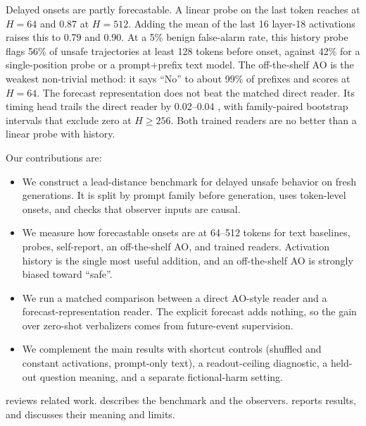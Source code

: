 Delayed onsets are partly forecastable. A linear probe on the last token reaches  at $H{=}64$ and 0.87 at $H{=}512$. Adding the mean of the last 16 layer-18 activations raises this to 0.79 and 0.90. At a 5\% benign false-alarm rate, this history probe flags 56\% of unsafe trajectories at least 128 tokens before onset, against 42\% for a single-position probe or a prompt+prefix text model. The off-the-shelf AO is the weakest non-trivial method: it says ``No'' to about 99\% of prefixes and scores  at $H{=}64$. The forecast representation does not beat the matched direct reader. Its timing head trails the direct reader by 0.02--0.04 \auroc, with family-paired bootstrap intervals that exclude zero at $H{\ge}256$. Both trained readers are no better than a linear probe with history.

Our contributions are:
\begin{itemize}[leftmargin=*,itemsep=0pt,topsep=0pt]
    \item We construct a lead-distance benchmark for delayed unsafe behavior on fresh \qwen generations. It is split by prompt family before generation, uses token-level onsets, and checks that observer inputs are causal.
    \item We measure how forecastable onsets are at 64--512 tokens for text baselines, probes, self-report, an off-the-shelf AO, and trained readers. Activation history is the single most useful addition, and an off-the-shelf AO is strongly biased toward ``safe''.
    \item We run a matched comparison between a direct AO-style reader and a forecast-representation reader. The explicit forecast adds nothing, so the gain over zero-shot verbalizers comes from future-event supervision.
    \item We complement the main results with shortcut controls (shuffled and constant activations, prompt-only text), a readout-ceiling diagnostic, a held-out question meaning, and a separate fictional-harm setting.
\end{itemize}

 reviews related work.  describes the benchmark and the observers.  reports results, and  discusses their meaning and limits.
